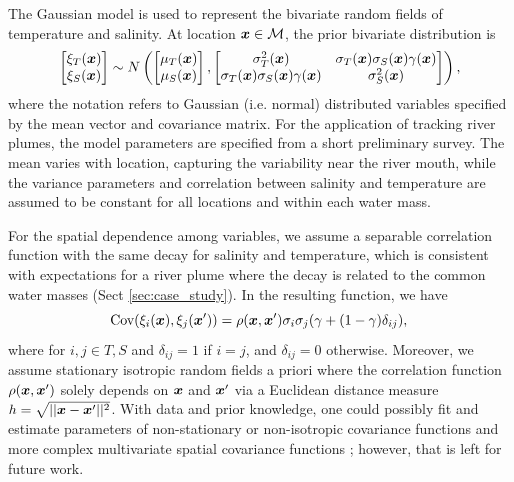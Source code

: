 \documentclass[aoas]{imsart}
\begin{document}
The Gaussian model is used to represent the bivariate random fields of temperature and salinity. At location ${\boldsymbol x} \in \mathcal{M}$, the prior bivariate distribution is
\begin{equation}\label{gp_bar}
  \begin{bmatrix}\xi_T(\bx) \\
    \xi_S(\bx) \end{bmatrix}
 \sim N \left( 
\begin{bmatrix} \mu_{T}(\bx)\\
\mu_{S}(\bx)
\end{bmatrix},\begin{bmatrix}
\sigma_{T}^2(\bx) & \sigma_{T}(\bx) \sigma_S(\bx) \gamma(\bx)  \\
\sigma_{T}(\bx) \sigma_S(\bx) \gamma(\bx)  & \sigma_{S}^2(\bx) 
\end{bmatrix}
\right),
\end{equation}
where the notation refers to Gaussian (i.e. normal) distributed variables
specified by the mean vector and covariance matrix. For the application
of tracking river plumes, the model parameters are specified from a short preliminary survey. The mean varies with location, capturing the variability near the river mouth, while the variance parameters and correlation between salinity and temperature are assumed to be constant for all locations and within each water mass. 

For the spatial dependence among variables, we assume a separable correlation function with the same decay for salinity and temperature,
which is consistent with expectations for  a river plume where the decay is related to the common water masses (Sect \ref{sec:case_study}). In the resulting function, we have
\begin{equation}\label{gp_corr}
\mbox{Cov}(\xi_i(\bx),\xi_j(\bx')) = \rho(\bx,\bx') \sigma_i \sigma_j (\gamma +(1-\gamma )\delta_{ij}), \\
\end{equation}
where for $i,j \in {T,S}$ and $\delta_{ij}=1$ if $i=j$, and $\delta_{ij}=0$
otherwise. Moreover, we assume stationary isotropic random fields a priori where the
correlation function $\rho({\boldsymbol x},{\boldsymbol x}')$ solely depends on ${\boldsymbol x}$ and
${\boldsymbol x}'$ via a Euclidean distance measure $h=\sqrt{||{\boldsymbol x}-{\boldsymbol x}'||^2}$. With
data and prior knowledge, one could possibly fit and estimate
parameters of non-stationary or non-isotropic covariance functions and
more complex multivariate spatial covariance functions
\citep{gneiting2010matern,genton2015cross}; however, that is left for
future work.
\end{document}
